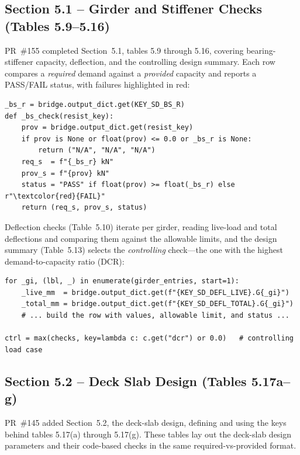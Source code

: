 \subsection{Section 5.1 -- Girder and Stiffener Checks (Tables 5.9--5.16)}
PR~\#155 completed Section~5.1, tables 5.9 through 5.16, covering bearing-stiffener capacity,
deflection, and the controlling design summary. Each row compares a \emph{required} demand
against a \emph{provided} capacity and reports a PASS/FAIL status, with failures highlighted in
red:

\begin{lstlisting}[caption={A design-check row: required vs.\ provided, with pass/fail (\texttt{report\_generator.py}).},label={lst:checkrow}]
_bs_r = bridge.output_dict.get(KEY_SD_BS_R)
def _bs_check(resist_key):
    prov = bridge.output_dict.get(resist_key)
    if prov is None or float(prov) <= 0.0 or _bs_r is None:
        return ("N/A", "N/A", "N/A")
    req_s  = f"{_bs_r} kN"
    prov_s = f"{prov} kN"
    status = "PASS" if float(prov) >= float(_bs_r) else r"\textcolor{red}{FAIL}"
    return (req_s, prov_s, status)
\end{lstlisting}

Deflection checks (Table~5.10) iterate per girder, reading live-load and total deflections and
comparing them against the allowable limits, and the design summary (Table~5.13) selects the
\emph{controlling} check---the one with the highest demand-to-capacity ratio (DCR):

\begin{lstlisting}[caption={Selecting the controlling design check by DCR (\texttt{report\_generator.py}).},label={lst:dcr}]
for _gi, (lbl, _) in enumerate(girder_entries, start=1):
    _live_mm  = bridge.output_dict.get(f"{KEY_SD_DEFL_LIVE}.G{_gi}")
    _total_mm = bridge.output_dict.get(f"{KEY_SD_DEFL_TOTAL}.G{_gi}")
    # ... build the row with values, allowable limit, and status ...

ctrl = max(checks, key=lambda c: c.get("dcr") or 0.0)   # controlling load case
\end{lstlisting}

\subsection{Section 5.2 -- Deck Slab Design (Tables 5.17a--g)}
PR~\#145 added Section~5.2, the deck-slab design, defining and using the keys behind tables
5.17(a) through 5.17(g). These tables lay out the deck-slab design parameters and their
code-based checks in the same required-vs-provided format.

